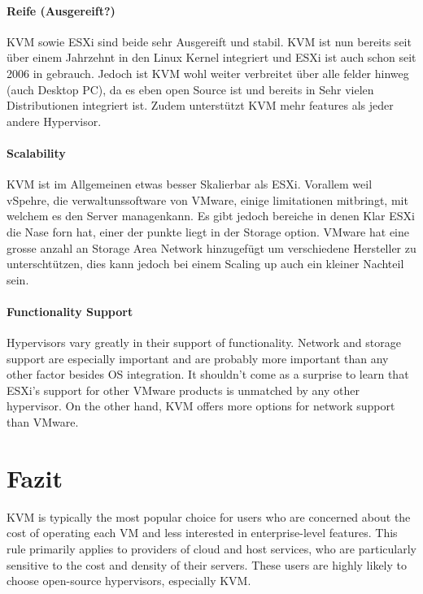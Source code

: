 \documentclass[14pt]{extreport}
\begin{document}
\subsubsection{Reife (Ausgereift?)}

KVM sowie ESXi sind beide sehr Ausgereift und stabil. KVM ist nun bereits seit über einem Jahrzehnt in den Linux Kernel integriert und ESXi ist auch schon seit 2006 in gebrauch. Jedoch ist KVM wohl weiter verbreitet über alle felder hinweg (auch Desktop PC), da es eben open Source ist und bereits in Sehr vielen Distributionen integriert ist. Zudem unterstützt KVM mehr features als jeder andere Hypervisor.

\subsubsection{Scalability}

KVM ist im Allgemeinen etwas besser Skalierbar als ESXi. Vorallem weil vSpehre, die verwaltunssoftware von VMware, einige limitationen mitbringt, mit welchem es den Server managenkann. Es gibt jedoch bereiche in denen Klar ESXi die Nase forn hat, einer der punkte liegt in der Storage option. VMware hat eine grosse anzahl an Storage Area Network hinzugefügt um verschiedene Hersteller zu unterschtützen, dies kann jedoch bei einem Scaling up auch ein kleiner Nachteil sein.

\subsubsection{Functionality Support}

Hypervisors vary greatly in their support of functionality. Network and storage support are especially important and are probably more important than any other factor besides OS integration. It shouldn’t come as a surprise to learn that ESXi’s support for other VMware products is unmatched by any other hypervisor. On the other hand, KVM offers more options for network support than VMware.

\chapter{Fazit}
KVM is typically the most popular choice for users who are concerned about the cost of operating each VM and less interested in enterprise-level features. This rule primarily applies to providers of cloud and host services, who are particularly sensitive to the cost and density of their servers. These users are highly likely to choose open-source hypervisors, especially KVM.
\end{document}
